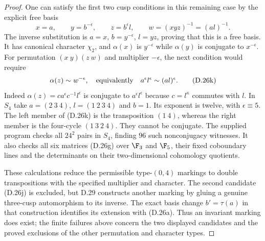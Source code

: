 \begin{proof}
One can satisfy the first two cusp conditions in this
remaining case by the explicit free basis
\[
 x=a,\qquad y=b^{-\epsilon},\qquad z=b^\epsilon l,
 \qquad w=(xyz)^{-1}=(al)^{-1}.                    \tag{D.26j}
\]
The inverse substitution is $a=x$, $b=y^{-\epsilon}$,
$l=yz$, proving that this is a free basis.
It has canonical character $\chi_2$, and
$\alpha(x)$ is $y^{-\epsilon}$ while $\alpha(y)$
is conjugate to $x^{-\epsilon}$. For permutation
$(x\ y)(z\ w)$ and multiplier $-\epsilon$, the next
condition would require
\[
 \alpha(z)\sim w^{-\epsilon},\quad\hbox{equivalently}\quad
                 a^\epsilon l^\epsilon\sim(al)^\epsilon.
                                                               \tag{D.26k}
\]
Indeed $\alpha(z)=c a^\epsilon c^{-1}l^\epsilon$
is conjugate to $a^\epsilon l^\epsilon$ because
$c=l^\kappa$ commutes with $l$. In $S_4$ take
$a=(2\ 3\ 4)$, $l=(1\ 2\ 3\ 4)$ and $b=1$.
Its exponent is twelve, with $\epsilon\equiv5$.
The left member of (D.26k) is the transposition $(1\ 4)$,
whereas the right member is the four-cycle
$(1\ 3\ 2\ 4)$. They cannot be conjugate.
The supplied program checks all $24^2$ pairs in $S_4$,
finding $96$ such nonconjugacy witnesses. It also checks
all six matrices (D.26g) over $\F_3$ and $\F_5$, their
fixed coboundary lines and the determinants on their
two-dimensional cohomology quotients.

These calculations reduce the permissible type-$(0,4)$
markings to double transpositions with the specified
multiplier and character. The second candidate (D.26j)
is excluded, but D.29 constructs another marking by
gluing a genuine three-cusp automorphism to its inverse.
The exact basis change $b'=\tau(a)$ in that construction
identifies its extension with (D.26a). Thus an invariant
marking does exist; the finite failures above concern
the two displayed candidates and the proved exclusions
of the other permutation and character types.
\end{proof}
